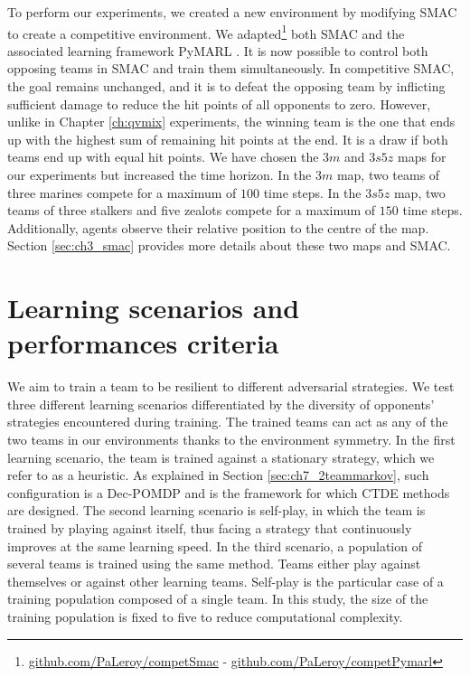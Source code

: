 To perform our experiments, we created a new environment by modifying SMAC to create a competitive environment. 
We adapted\footnote{\label{foot_note_code}\url{github.com/PaLeroy/competSmac} - \url{github.com/PaLeroy/competPymarl}} both SMAC and the associated learning framework PyMARL \citep{samvelyan2019starcraft}.
It is now possible to control both opposing teams in SMAC and train them simultaneously.
In competitive SMAC, the goal remains unchanged, and it is to defeat the opposing team by inflicting sufficient damage to reduce the hit points of all opponents to zero.
However, unlike in Chapter \ref{ch:qvmix} experiments, the winning team is the one that ends up with the highest sum of remaining hit points at the end.
It is a draw if both teams end up with equal hit points.
We have chosen the $3m$ and $3s5z$ maps for our experiments but increased the time horizon.
In the $3m$ map, two teams of three marines compete for a maximum of $100$ time steps.
In the $3s5z$ map, two teams of three stalkers and five zealots compete for a maximum of $150$ time steps.
Additionally, agents observe their relative position to the centre of the map.
Section \ref{sec:ch3_smac} provides more details about these two maps and SMAC.

\section{Learning scenarios and performances criteria} \label{sec:ch7_learningscenar}
We aim to train a team to be resilient to different adversarial strategies.
We test three different learning scenarios differentiated by the diversity of opponents' strategies encountered during training.
The trained teams can act as any of the two teams in our environments thanks to the environment symmetry.
In the first learning scenario, the team is trained against a stationary strategy, which we refer to as a heuristic.
As explained in Section \ref{sec:ch7_2teammarkov}, such configuration is a Dec-POMDP and is the framework for which CTDE methods are designed.
The second learning scenario is self-play, in which the team is trained by playing against itself, thus facing a strategy that continuously improves at the same learning speed.
In the third scenario, a population of several teams is trained using the same method.
Teams either play against themselves or against other learning teams.
Self-play is the particular case of a training population composed of a single team.
In this study, the size of the training population is fixed to five to reduce computational complexity.

